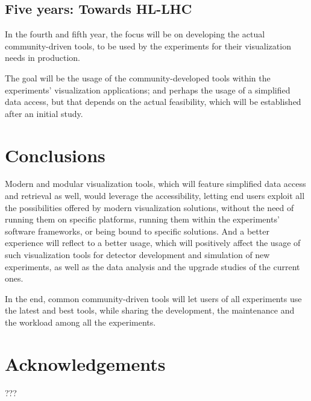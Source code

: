 \documentclass[12pt,a4paper]{article}
\begin{document}
\hypertarget{five-year}{%
\subsection{Five years: Towards HL-LHC}\label{five-year}}

In the fourth and fifth year, the focus will be on developing the actual community-driven tools, to be used by the experiments
for their visualization needs in production.

The goal will be the usage of the community-developed tools within the experiments’ visualization applications; and
perhaps the usage of a simplified data access, but that depends on the actual feasibility, which will be established
after an initial study.

\hypertarget{conclusions}{%
\section{Conclusions}\label{conclusions}}

Modern and modular visualization tools, which will feature simplified data access and retrieval as well, would leverage
the accessibility, letting end users exploit all the possibilities offered by modern visualization solutions, without the need
of running them on specific platforms, running them within the experiments’ software frameworks, or being bound to specific solutions.
And a better experience will reflect to a better usage, which will positively affect the usage of such visualization tools for
detector development and simulation of new experiments, as well as the data analysis and the upgrade studies of the current ones.

In the end, common community-driven tools will let users of all experiments use the latest and best tools, while sharing the development,
the maintenance and the workload among all the experiments.

\hypertarget{acknowledgements}{%
\section{Acknowledgements}\label{acknowledgements}}

???

%
\end{document}
